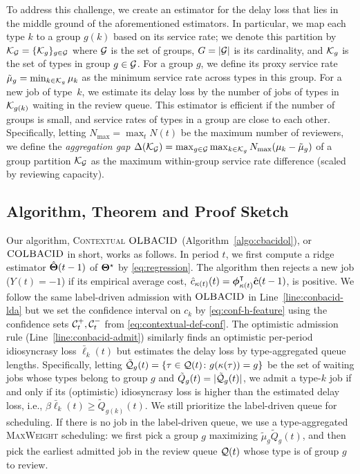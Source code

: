 To address this challenge, we create an estimator for the delay loss that lies in the middle ground of the aforementioned estimators. In particular, we map each type $k$ to a group $g(k)$ based on its  service rate; we denote this partition by $\mathcal{K}_{\mathcal{G}} = \{\mathcal{K}_g\}_{g \in \mathcal{G}}$ where $\mathcal{G}$ is the set of groups, $G=|\mathcal{G}|$ is its cardinality, and $\mathcal{K}_g$ is the set of types in group $g \in \mathcal{G}$.
For a group $g$, we define its proxy service rate $\tilde{\mu}_g = \min_{k \in \mathcal{K}_g} \mu_k$ as the minimum service rate across types in this group. For a new job of type~$k$, we estimate its delay loss by the number of jobs of types in $\mathcal{K}_{g(k)}$ waiting in the review queue. This estimator is efficient if the number of groups is small, and service rates of types in a group are close to each other. Specifically, letting $N_{\max} = \max_t N(t)$ be the maximum number of reviewers, we define the \emph{aggregation gap} $\Delta(\mathcal{K}_{\mathcal{G}})= \max_{g \in \mathcal{G}} \max_{k \in \mathcal{K}_g} N_{\max}(\mu_{k} - \tilde{\mu}_g)$ of a group partition $\mathcal{K}_{\mathcal{G}}$ as the maximum within-group service rate difference (scaled by reviewing capacity). 

\subsection{Algorithm, Theorem and Proof Sketch}
Our algorithm, \textsc{Contextual} $\textsc{OLBACID}$ (Algorithm~\ref{algo:cbacidol}), or $\textsc{COLBACID}$ in short, works as follows. In
period $t$, we first compute a ridge estimator $\hat{\boldsymbol{\Theta}}(t-1)$ of $\boldsymbol{\Theta}^\star$ by \eqref{eq:regression}. The algorithm then rejects a new job ($Y(t) = -1$) if its empirical average cost, $\hat{c}_{\kappa(t)}(t)=\boldsymbol{\phi}_{\kappa(t)}^{\intercal}\hat{\boldsymbol{c}}(t-1)$, is positive. We follow the same label-driven admission with $\textsc{OLBACID}$ in Line~\ref{line:conbacid-lda} but we set the confidence interval on $c_{k}$ by \eqref{eq:conf-h-feature} using the confidence sets $\mathcal{C}_t^+, \mathcal{C}_t^-$  from \eqref{eq:contextual-def-conf}. The optimistic admission rule (Line~\ref{line:conbacid-admit}) similarly finds an optimistic per-period idiosyncrasy loss $\bar{\ell}_k(t)$ but estimates the delay loss by type-aggregated queue lengths. Specifically, letting $\tilde{\mathcal{Q}}_g(t) = \{\tau \in \mathcal{Q}(t)\colon g(\kappa(\tau)) = g\}$ be the set of waiting jobs whose types belong to group $g$ and $\tilde{Q}_g(t) = |\tilde{\mathcal{Q}}_g(t)|$, we admit a type-$k$ job if and only if its (optimistic) idiosyncrasy loss is higher than the estimated delay loss, i.e., $\beta \bar{\ell}_{k}(t) \geq \tilde{Q}_{g(k)}(t)$. We still prioritize the label-driven queue for scheduling. If there is no job in the label-driven queue, we use a type-aggregated \textsc{MaxWeight} scheduling: we first pick a group $g$ maximizing $\tilde{\mu}_g \tilde{Q}_g(t)$, and then pick the earliest admitted job in the review queue $\mathcal{Q}(t)$ whose type is of group $g$ to review. 

